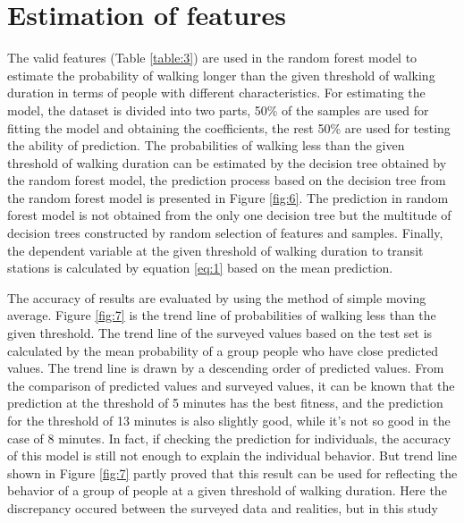 \documentclass[Journal,letterpaper]{ascelike-new}
\begin{document}
%
\section{Estimation of features}
The valid features (Table \ref{table:3}) are used in the random forest model to estimate the probability of walking longer than the given threshold of walking duration in terms of people with different characteristics. For estimating the model, the dataset is divided into two parts, 50\% of the samples are used for fitting the model and obtaining the coefficients, the rest 50\% are used for testing the ability of prediction. The probabilities of walking less than the given threshold of walking duration can be estimated by the decision tree obtained by the random forest model, the prediction process based on the decision tree from the random forest model is presented in Figure \ref{fig:6}. The prediction in random forest model is not obtained from the only one decision tree but the multitude of decision trees constructed by random selection of features and samples. Finally, the dependent variable at the given threshold of walking duration to transit stations is calculated by equation \ref{eq:1} based on the mean prediction.

%
The accuracy of results are evaluated by using the method of simple moving average. Figure \ref{fig:7} is the trend line of probabilities of walking less than the given threshold. 
The trend line of the surveyed values based on the test set is calculated by the mean probability of a group people who have close predicted values. The trend line is drawn by a descending order of predicted values. From the comparison of predicted values and surveyed values, it can be known that the prediction at the threshold of 5 minutes has the best fitness, and the prediction for the threshold of 13 minutes is also slightly good, while it’s not so good in the case of 8 minutes. In fact, if checking the prediction for individuals, the accuracy of this model is still not enough to explain the individual behavior. But trend line shown in Figure \ref{fig:7} partly proved that this result can be used for reflecting the behavior of a group of people at a given threshold of walking duration. Here the discrepancy occured between the surveyed data and realities, but in this study

%
\end{document}
